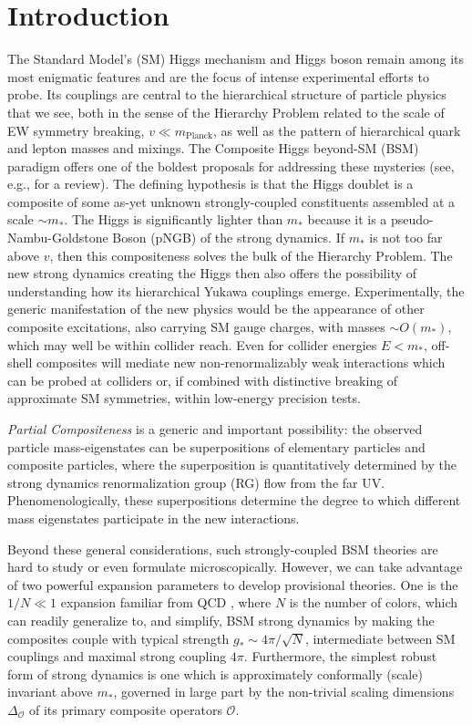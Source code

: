 \documentclass[aps,prl,twocolumn,showpacs,10pt,preprintnumbers,nofootinbib]{revtex4-2}
\newcommand{\op}{\mathcal{O}}
\begin{document}
\medskip

\section{Introduction}

The Standard Model's (SM) Higgs mechanism and Higgs boson remain among its most enigmatic features and are the focus of intense experimental efforts to probe. Its couplings are central to the hierarchical structure of particle physics that we see, both in the sense of the Hierarchy Problem related to the scale of EW symmetry breaking, $v \ll m_{\text{Planck}}$, as well as the pattern of hierarchical quark and lepton masses and mixings. The Composite Higgs beyond-SM (BSM) paradigm offers one of the boldest proposals for addressing these mysteries (see, e.g., \cite{Panico:2015jxa} for a review). The defining hypothesis is that the Higgs doublet is a composite of some as-yet unknown strongly-coupled constituents assembled at a scale $\sim m_*$. The Higgs is significantly lighter than $m_*$ because it is a pseudo-Nambu-Goldstone Boson (pNGB) of the strong dynamics.
If $m_*$ is not too far above $v$, then this compositeness solves the bulk of the Hierarchy Problem. The new strong dynamics creating the Higgs then also offers the possibility of understanding how its hierarchical Yukawa couplings emerge. Experimentally, the generic manifestation of the new physics would be the appearance of other composite excitations, also carrying SM gauge charges, with masses $\sim O(m_*)$, which may well be within collider reach. Even for collider energies $E < m_*$, off-shell composites will mediate new non-renormalizably weak interactions which can be probed at colliders or, if combined with distinctive breaking of approximate SM symmetries, within low-energy precision tests. 

{\it Partial Compositeness} \cite{Kaplan:1991dc} is a generic and important possibility: the observed particle mass-eigenstates can be superpositions of elementary particles and composite particles, where the  superposition is quantitatively determined by the strong dynamics renormalization group (RG) flow from the far UV. Phenomenologically, these superpositions determine the degree
to which different mass eigenstates participate in the new interactions. 

Beyond these general considerations, such strongly-coupled BSM theories are hard to study or even formulate microscopically. However, we can take advantage of two powerful expansion parameters to develop provisional theories.  One is the $1/N \ll 1$ expansion familiar from QCD \cite{Coleman_1985}, where $N$ is the number of colors, which can readily generalize to, and simplify, BSM strong dynamics by making the composites couple with typical strength $g_* \sim 4 \pi/\sqrt{N}$, intermediate between SM couplings and maximal strong coupling $4 \pi$. Furthermore, the simplest robust form of strong dynamics is one which is approximately conformally (scale) invariant above $m_*$, governed in large part by the non-trivial scaling dimensions $\Delta_{\op}$ of its primary composite operators $\op$. 
\end{document}
